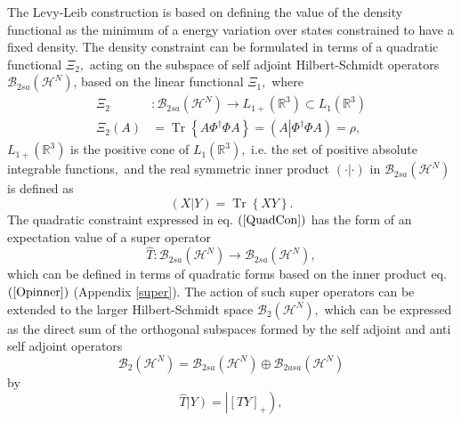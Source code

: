\documentclass[aps,preprint]{revtex4}%
\begin{document}
The Levy-Leib construction \cite{MelLevy12151979,Lieb1983} is based on
defining the value of the density functional as the minimum of a energy
variation over states constrained to have a fixed density. The density
constraint can be formulated in terms of a quadratic functional $\Xi_{2},$
acting on the subspace of self adjoint Hilbert-Schmidt operators
$\mathcal{B}_{2sa}\left(  \mathcal{H}^{N}\right)  $, based on the linear
functional $\Xi_{1},$ where
\begin{align}
\Xi_{2}  &  :\mathcal{B}_{2sa}\left(  \mathcal{H}^{N}\right)  \rightarrow
L_{1+}\left(  \mathbb{R}^{3}\right)  \subset L_{1}\left(  \mathbb{R}%
^{3}\right) \nonumber\\
\Xi_{2}\left(  A\right)   &  =\operatorname{Tr}\left\{  A\Phi^{\dagger}\Phi
A\right\}  =\left(  A\left\vert \Phi^{\dagger}\Phi A\right.  \right)  =\rho,
\label{QuadCon}%
\end{align}
$L_{1+}\left(  \mathbb{R}^{3}\right)  $ is the positive cone of $L_{1}\left(
\mathbb{R}^{3}\right)  ,$ i.e. the set of positive absolute integrable
functions$,$ and the real symmetric inner product $\left(  \cdot\left\vert
\cdot\right.  \right)  $ in $\mathcal{B}_{2sa}\left(  \mathcal{H}^{N}\right)
$ is defined as
\begin{equation}
\left(  X\left\vert Y\right.  \right)  =\operatorname{Tr}\left\{  XY\right\}
. \label{Opinner}%
\end{equation}
The quadratic constraint expressed in eq. $\left(  \ref{QuadCon}\right)  $ has
the form of an expectation value of a super operator
\begin{equation}
\widehat{T}:\mathcal{B}_{2sa}\left(  \mathcal{H}^{N}\right)  \rightarrow
\mathcal{B}_{2sa}\left(  \mathcal{H}^{N}\right)  ,
\end{equation}
which can be defined in terms of quadratic forms based on the inner product
eq. $\left(  \ref{Opinner}\right)  $ (Appendix \ref{super}). The action of
such super operators can be extended to the larger Hilbert-Schmidt space
$\mathcal{B}_{2}\left(  \mathcal{H}^{N}\right)  ,$ which can be expressed as
the direct sum of the orthogonal subspaces formed by the self adjoint and anti
self adjoint operators
\begin{equation}
\mathcal{B}_{2}\left(  \mathcal{H}^{N}\right)  =\mathcal{B}_{2sa}\left(
\mathcal{H}^{N}\right)  \oplus\mathcal{B}_{2asa}\left(  \mathcal{H}%
^{N}\right)
\end{equation}
by
\begin{equation}
\widehat{T}\left\vert Y\right)  =\left\vert \left[  TY\right]  _{+}\right)  ,
\end{equation}
\end{document}

